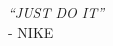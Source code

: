 \clearpage
{}%

\begin{Center}
	\centering \MakeUppercase {\textit{“Just Do It”}}\\
	- NIKE 
\end{Center}
 
\clearpage